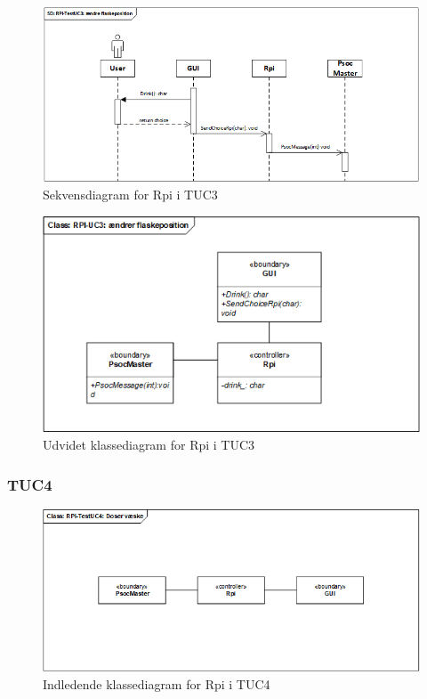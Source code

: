 \begin{figure}[H]
    \centering
    \includegraphics[width=1\textwidth]{Images/Applikationsmodeller/rpi/rpi_sekvensdiagramTestUC3.png}
    \caption{Sekvensdiagram for Rpi i TUC3}
    \label{fig:sdTUC3Rpi}
\end{figure}

\begin{figure}[H]
    \centering
    \includegraphics[width=1\textwidth]{Images/Applikationsmodeller/rpi/rpi_UdvidetklassediagramTestUC3.png}
    \caption{Udvidet klassediagram for Rpi i TUC3}
    \label{fig:UcdTUC3Rpi}
\end{figure}

\subsubsection{TUC4}

\begin{figure}[H]
    \centering
    \includegraphics[width=1\textwidth]{Images/Applikationsmodeller/rpi/rpi_klassediagramTestUC4.png}
    \caption{Indledende klassediagram for Rpi i TUC4}
    \label{fig:cdTUC4Rpi}
\end{figure}

